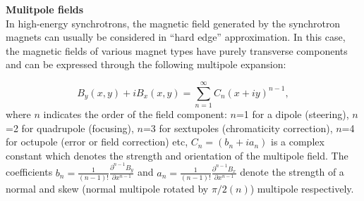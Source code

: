 \textbf{Mulitpole fields}\\
In high-energy synchrotrons, the magnetic field generated by the synchrotron magnets can usually be considered in “hard edge” approximation. In this case,
the magnetic fields of various magnet types have purely transverse components and can be expressed through the following multipole expansion:

\begin{equation}\label{eq:mult_expansion} %
    B_y(x,y) + i B_x(x,y) = \sum_{n=1}^{\infty} C_n (x+i y)^{n-1},
\end{equation} %
where $n$ indicates the order of the field component: $n$=1 for a dipole (steering), $n$=2 for quadrupole (focusing), $n$=3 for sextupoles (chromaticity correction), $n$=4 for octupole (error or field correction) etc, $C_n=(b_n +i a_n)$ is a complex constant which denotes the strength and orientation of the multipole field. The coefficients $b_n=\frac{1}{(n-1)!} \frac{\partial^{n-1}B_y}{\partial x^{n-1}}$ and $a_n=\frac{1}{(n-1)!} \frac{\partial^{n-1}B_x}{\partial x^{n-1}}$ denote the strength of a normal and skew (normal multipole rotated by $\pi/2(n)$) multipole respectively.%


